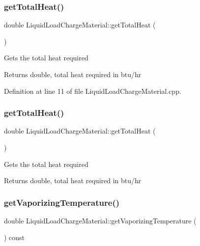 \subsubsection{\texorpdfstring{get\+Total\+Heat()}{getTotalHeat()}\hspace{0.1cm}{\footnotesize\ttfamily [2/3]}}
{\footnotesize\ttfamily double Liquid\+Load\+Charge\+Material\+::get\+Total\+Heat (\begin{DoxyParamCaption}{ }\end{DoxyParamCaption})}

Gets the total heat required

\begin{DoxyReturn}{Returns}
double, total heat required in btu/hr 
\end{DoxyReturn}


Definition at line 11 of file Liquid\+Load\+Charge\+Material.\+cpp.

\mbox{\label{class_liquid_load_charge_material_a51a9826325e2c34cd073b8766331d476}} 
\subsubsection{\texorpdfstring{get\+Total\+Heat()}{getTotalHeat()}\hspace{0.1cm}{\footnotesize\ttfamily [3/3]}}
{\footnotesize\ttfamily double Liquid\+Load\+Charge\+Material\+::get\+Total\+Heat (\begin{DoxyParamCaption}{ }\end{DoxyParamCaption})}

Gets the total heat required

\begin{DoxyReturn}{Returns}
double, total heat required in btu/hr 
\end{DoxyReturn}
\mbox{\label{class_liquid_load_charge_material_a07004e345fb4ff287d435d0c84027973}} 
\subsubsection{\texorpdfstring{get\+Vaporizing\+Temperature()}{getVaporizingTemperature()}\hspace{0.1cm}{\footnotesize\ttfamily [1/3]}}
{\footnotesize\ttfamily double Liquid\+Load\+Charge\+Material\+::get\+Vaporizing\+Temperature (\begin{DoxyParamCaption}{ }\end{DoxyParamCaption}) const\hspace{0.3cm}{\ttfamily [inline]}}

